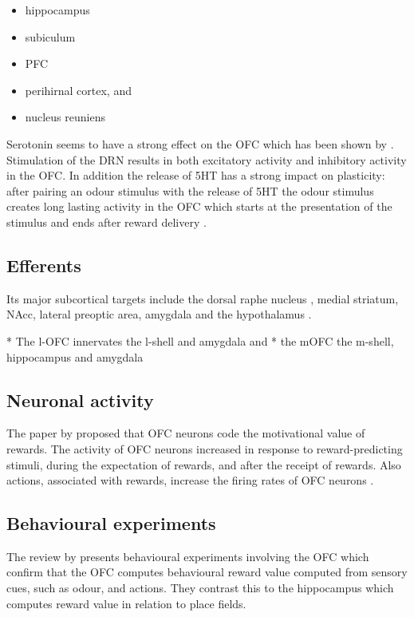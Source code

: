 \documentclass[12pt,a4paper]{article}
\begin{document}
\begin{itemize}
\item hippocampus
\item subiculum
\item PFC
\item perihirnal cortex, and
\item nucleus reuniens
\end{itemize}

Serotonin seems to have a strong effect on the OFC which has been shown by \citep{Zhou2015}. Stimulation of the DRN results in both excitatory activity and inhibitory activity in the OFC. In addition the release of 5HT has a strong impact on plasticity: after pairing an odour stimulus with the release of 5HT the odour stimulus creates long lasting activity in the OFC which starts at the presentation of the stimulus and ends after reward delivery  \citep{Zhou2015}.

\subsection{Efferents}

Its major subcortical targets include the dorsal raphe nucleus \citep{Luo2015}, medial striatum, NAcc, lateral preoptic area, amygdala and the hypothalamus \citep{Vertes2012}.

  * The l-OFC innervates the l-shell and amygdala and 
  * the mOFC the m-shell, hippocampus and amygdala \citep{Brog1993} \citep{Noonan2012}

\subsection{Neuronal activity}

The paper by \citep{Tremblay1999} proposed that OFC neurons code the motivational value of rewards. The activity of OFC neurons increased in response to reward-predicting stimuli, during the expectation of rewards, and after the receipt of rewards. Also actions, associated with rewards, increase the firing rates of OFC neurons \citep{Wikenheiser2016}.

\subsection{Behavioural experiments}

The review by \citep{Wikenheiser2016} presents behavioural experiments involving the OFC which confirm that the OFC computes behavioural reward value computed from sensory cues, such as odour, and actions. They contrast this to the hippocampus which computes reward value in relation to place fields.
\end{document}
